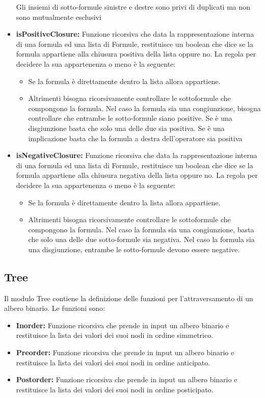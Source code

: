 \documentclass[\main/tesi.tex]{subfiles}
\begin{document}
\begin{itemize}
          Gli insiemi di sotto-formule sinistre e destre sono privi di duplicati ma non sono mutualmente esclusivi
    \item \textbf{isPositiveClosure:} Funzione ricorsiva che data la rappresentazione interna di una formula ed una lista di Formule, restituisce un boolean che dice se la formula appartiene alla chiusura positiva della lista oppure no. La regola per decidere la sua appartenenza o meno è la seguente:
          \begin{itemize}
              \item Se la formula è direttamente dentro la lista allora appartiene.
              \item Altrimenti bisogna ricorsivamente controllare le sottoformule che compongono la formula. Nel caso la formula sia una congiunzione, bisogna controllare che entrambe le sotto-formule siano positive. Se è una disgiunzione basta che solo una delle due sia positiva. Se è una implicazione basta che la formula a destra dell'operatore sia positiva
          \end{itemize}
    \item \textbf{isNegativeClosure:} Funzione ricorsiva che data la rappresentazione interna di una formula ed una lista di Formule, restituisce un boolean che dice se la formula appartiene alla chiusura negativa della lista oppure no. La regola per decidere la sua appartenenza o meno è la seguente:
          \begin{itemize}
              \item Se la formula è direttamente dentro la lista allora appartiene.
              \item Altrimenti bisogna ricorsivamente controllare le sottoformule che compongono la formula. Nel caso la formula sia una congiunzione, basta che solo una delle due sotto-formule sia negativa. Nel caso la formula sia una disgiunzione, entrambe le sotto-formule devono essere negative.
          \end{itemize}
\end{itemize}

\subsection{Tree}
Il modulo Tree contiene la definizione delle funzioni per l'attraversamento di un albero binario. Le funzioni sono:
\begin{itemize}
    \item \textbf{Inorder:} Funzione ricorsiva che prende in input un albero binario e restituisce la lista dei valori dei suoi nodi in ordine simmetrico.
    \item \textbf{Preorder:} Funzione ricorsiva che prende in input un albero binario e restituisce la lista dei valori dei suoi nodi in ordine anticipato.
    \item \textbf{Postorder:} Funzione ricorsiva che prende in input un albero binario e restituisce la lista dei valori dei suoi nodi in ordine posticipato.
\end{itemize}
\end{document}
